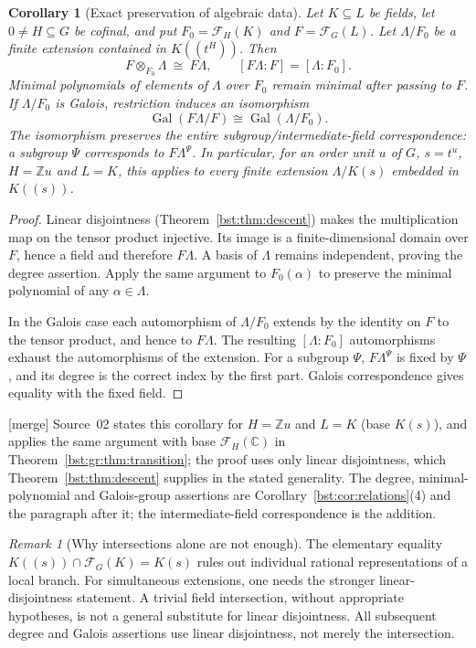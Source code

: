 \documentclass[11pt,letterpaper]{article}
\newtheorem{corollary}[theorem]{Corollary}
\theoremstyle{definition}
\theoremstyle{remark}
\newtheorem{remark}[theorem]{Remark}
\newcommand{\C}{\mathbb C}
\newcommand{\Z}{\mathbb Z}
\newcommand{\HH}[2]{#1((t^{#2}))}
\newcommand{\FF}[2]{\mathcal F_{#2}(#1)}
\newcommand{\Gal}{\operatorname{Gal}}
\begin{document}
\begin{corollary}[Exact preservation of algebraic data]\label{bst:gr:cor:transport}
Let $K\subseteq L$ be fields, let $0\ne H\subseteq G$ be cofinal, and put
$F_0=\FF KH$ and $F=\FF LG$. Let $\Lambda/F_0$ be a finite extension contained
in $\HH KH$. Then
\[
 F\otimes_{F_0}\Lambda\ \cong\ F\Lambda,
 \qquad [F\Lambda:F]=[\Lambda:F_0].
\]
Minimal polynomials of elements of $\Lambda$ over $F_0$ remain minimal after
passing to $F$. If $\Lambda/F_0$ is Galois, restriction induces an isomorphism
\[
 \Gal(F\Lambda/F)\cong\Gal(\Lambda/F_0).
\]
The isomorphism preserves the entire subgroup/intermediate-field
correspondence: a subgroup $\Psi$ corresponds to $F\Lambda^\Psi$.
In particular, for an order unit $u$ of $G$, $s=t^u$, $H=\Z u$ and $L=K$,
this applies to every finite extension $\Lambda/K(s)$ embedded in $K((s))$.
\end{corollary}
\begin{proof}
Linear disjointness (Theorem~\ref{bst:thm:descent}) makes the multiplication
map on the tensor product injective. Its image is a finite-dimensional domain
over $F$, hence a field and therefore $F\Lambda$. A basis of $\Lambda$ remains
independent, proving the degree assertion. Apply the same argument to
$F_0(\alpha)$ to preserve the minimal polynomial of any $\alpha\in\Lambda$.

In the Galois case each automorphism of $\Lambda/F_0$ extends by the identity
on $F$ to the tensor product, and hence to $F\Lambda$. The resulting
$[\Lambda:F_0]$ automorphisms exhaust the automorphisms of the extension.
For a subgroup $\Psi$, $F\Lambda^\Psi$ is fixed by $\Psi$, and its degree is
the correct index by the first part. Galois correspondence gives equality
with the fixed field.
\end{proof}

\textup{[merge]} Source~02 states this corollary for $H=\Z u$ and $L=K$
(base $K(s)$), and applies the same argument with base $\FF{\C}H$ in
Theorem~\ref{bst:gr:thm:transition}; the proof uses only linear
disjointness, which Theorem~\ref{bst:thm:descent} supplies in the stated
generality. The degree, minimal-polynomial and Galois-group assertions are
Corollary~\ref{bst:cor:relations}(4) and the paragraph after it; the
intermediate-field correspondence is the addition.

\begin{remark}[Why intersections alone are not enough]\label{bst:gr:rem:intersections}
The elementary equality $K((s))\cap\FF KG=K(s)$ rules out individual rational
representations of a local branch. For simultaneous extensions, one needs
the stronger linear-disjointness statement. A trivial field intersection,
without appropriate hypotheses, is not a general substitute for linear
disjointness. All subsequent degree and Galois assertions use linear
disjointness, not merely the intersection.
\end{remark}
\end{document}
